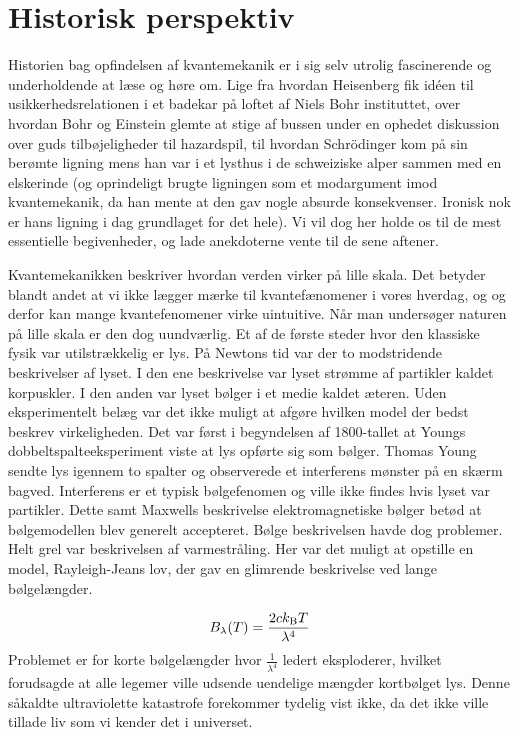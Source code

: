 \documentclass[../Kvantemekanik.tex]{subfiles}
\begin{document}
\section{Historisk perspektiv}
Historien bag opfindelsen af kvantemekanik er i sig selv utrolig fascinerende og underholdende at læse og høre om. Lige fra hvordan Heisenberg fik idéen til usikkerhedsrelationen i et badekar på loftet af Niels Bohr instituttet, over hvordan Bohr og Einstein glemte at stige af bussen under en ophedet diskussion over guds tilbøjeligheder til hazardspil, til hvordan Schrödinger kom på sin berømte ligning mens han var i et lysthus i de schweiziske alper sammen med en elskerinde (og oprindeligt brugte ligningen som et modargument imod kvantemekanik, da han mente at den gav nogle absurde konsekvenser. Ironisk nok er hans ligning i dag grundlaget  for det hele). Vi vil dog her holde os til de mest essentielle begivenheder, og lade anekdoterne vente til de sene aftener.


Kvantemekanikken beskriver hvordan verden virker på lille skala.
Det betyder blandt andet at vi ikke lægger mærke til kvantefænomener i vores hverdag, og og derfor kan mange kvantefenomener virke uintuitive.
Når man undersøger naturen på lille skala er den dog uundværlig.
Et af de første steder hvor den klassiske fysik var utilstrækkelig er lys.
På Newtons tid var der to modstridende beskrivelser af lyset.
I den ene beskrivelse var lyset strømme af partikler kaldet korpuskler.
I den anden var lyset bølger i et medie kaldet æteren.
Uden eksperimentelt belæg var det ikke muligt at afgøre hvilken model der bedst beskrev virkeligheden.
Det var først i begyndelsen af 1800-tallet at Youngs dobbeltspalteeksperiment viste at lys opførte sig som bølger.
Thomas Young sendte lys igennem to spalter og observerede et interferens mønster på en skærm bagved.
Interferens er et typisk bølgefenomen og ville ikke findes hvis lyset var partikler.
Dette samt Maxwells beskrivelse elektromagnetiske bølger betød at bølgemodellen blev generelt accepteret.
Bølge beskrivelsen havde dog problemer.
Helt grel var beskrivelsen af varmestråling.
Her var det muligt at opstille en model, Rayleigh-Jeans lov, der gav en glimrende beskrivelse ved lange bølgelængder.

$$
B_\lambda (T)= \frac{2ck_{\text{B}}T}{\lambda^4}
$$
Problemet er for korte bølgelængder hvor $\frac{1}{\lambda^4}$ ledert eksploderer, hvilket forudsagde at alle legemer ville udsende uendelige mængder kortbølget lys. Denne såkaldte ultraviolette katastrofe forekommer tydelig vist ikke, da det ikke ville tillade liv som vi kender det i universet.
\end{document}
